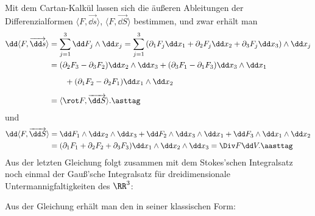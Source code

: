 \begin{antwort}
  Mit dem Cartan-Kalkül lassen sich die äußeren 
  Ableitungen der Differenzialformen 
  $\langle F , \overrightarrow{ \dd s } \rangle$, 
  $\langle  F ,\overrightarrow{ \dd S } \rangle$ bestimmen, 
  und zwar erhält man 
  \begin{align}
    \dd \langle F, \overrightarrow{ \dd s } \rangle &= 
    \sum_{j=1}^3 \dd F_j \wedge \dd x_j = 
    \sum_{j=1}^3 \left( \partial_1 F_j \dd x_1+ 
      \partial_2 F_j \dd x_2  + 
      \partial_3 F_j \dd x_3 \right) \wedge \dd x_j \notag \\
    &=(\partial_2 F_3 - \partial_3 F_2) \dd x_2 \wedge \dd x_3+ 
    (\partial_3 F_1-\partial_1 F_3)\dd x_3 \wedge \dd x_1 \notag \\[2mm] 
    &\qquad +(\partial_1 F_2 - \partial_2 F_1) \dd x_1 \wedge \dd x_2 \notag \\[2mm]
    &=\langle \rot F, \overrightarrow{ \dd S }\rangle. \asttag
  \end{align}
  und 
  \begin{align}
    \dd \langle F, \overrightarrow{ \dd S } \rangle &=
    \dd F_1 \wedge \dd x_2 \wedge \dd x_3 +
    \dd F_2 \wedge \dd x_3 \wedge \dd x_1 + 
    \dd F_3 \wedge \dd x_1 \wedge \dd x_2 \notag \\
    &=
    (\partial_1 F_1 + \partial_2 F_2 + \partial_3 F_3)
    \dd x_1 \wedge \dd x_2 \wedge \dd x_3 = \Div F \dd V. \aasttag
  \end{align}
  Aus der letzten Gleichung folgt zusammen mit dem Stokes'schen 
  Integralsatz noch einmal der Gauß'sche Integralsatz für dreidimensionale 
  Untermannigfaltigkeiten des $\RR^3$: 

  \medskip
  \noindent{}



  Aus der Gleichung {\astastref} erhält man den  in seiner klassischen Form: 

  \medskip
  \noindent{}    


\end{antwort}
